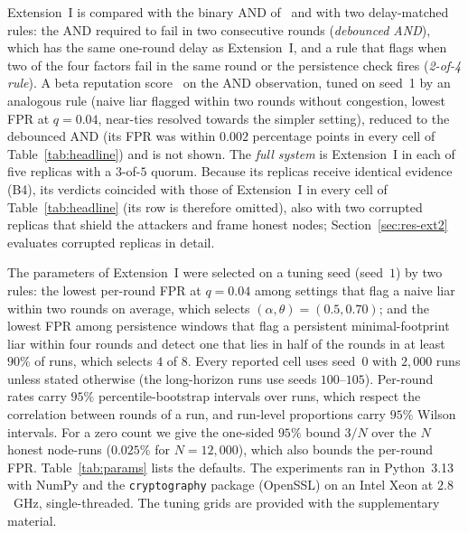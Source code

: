 Extension~I is compared with the binary AND of~\cite{soula2024iodt}
and with two delay-matched rules: the AND required to fail in two
consecutive rounds (\emph{debounced AND}), which has the same one-round
delay as Extension~I, and a rule that flags when two of the four
factors fail in the same round or the persistence check fires
(\emph{2-of-4 rule}).  A beta reputation score~\cite{josang2002beta}
on the AND observation, tuned on seed~1 by an analogous rule
(naive liar flagged within two rounds without congestion, lowest FPR
at $q=0.04$, near-ties resolved towards the simpler setting),
reduced to the debounced AND (its FPR was within $0.002$ percentage
points in every cell of Table~\ref{tab:headline}) and is not shown.
The \emph{full system} is Extension~I in each of five replicas with a
$3$-of-$5$ quorum.  Because its replicas receive identical evidence
(B4), its verdicts coincided with those of Extension~I in every cell
of Table~\ref{tab:headline} (its row is therefore omitted), also with two corrupted replicas that
shield the attackers and frame honest nodes;
Section~\ref{sec:res-ext2} evaluates corrupted replicas in detail.

The parameters of Extension~I were selected on a tuning seed (seed~$1$)
by two rules: the lowest per-round FPR at $q=0.04$ among settings that
flag a naive liar within two rounds on average, which selects
$(\alpha,\theta)=(0.5,0.70)$; and the lowest FPR among persistence
windows that flag a persistent minimal-footprint liar within four
rounds and detect one that lies in half of the rounds in at least
$90\%$ of runs, which selects $4$ of $8$.  Every reported cell uses
seed~$0$ with $2{,}000$ runs unless stated otherwise (the long-horizon
runs use seeds $100$--$105$).  Per-round rates carry $95\%$
percentile-bootstrap intervals over runs, which respect the correlation
between rounds of a run, and run-level proportions carry $95\%$ Wilson
intervals.  For a zero count we give the one-sided $95\%$ bound $3/N$
over the $N$ honest node-runs ($0.025\%$ for $N=12{,}000$), which also
bounds the per-round FPR.  Table~\ref{tab:params} lists the defaults.
The experiments ran in Python~3.13 with NumPy and the
\texttt{cryptography} package (OpenSSL) on an Intel Xeon at $2.8$~GHz,
single-threaded.  The tuning grids are provided with the
supplementary material.


